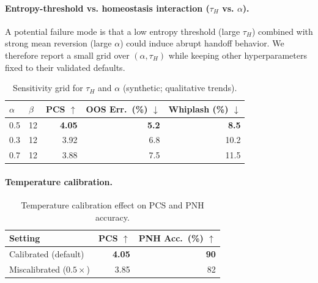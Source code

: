 \documentclass[11pt]{article}
\begin{document}
\paragraph{Entropy-threshold vs. homeostasis interaction ($\tau_H$ vs. $\alpha$).}
A potential failure mode is that a low entropy threshold (large $\tau_H$) combined with strong mean reversion (large $\alpha$) could induce abrupt handoff behavior. We therefore report a small grid over $(\alpha,\tau_H)$ while keeping other hyperparameters fixed to their validated defaults.

\begin{table}[h]
  \caption{Sensitivity grid for $\tau_H$ and $\alpha$ (synthetic; qualitative trends).}
  \label{tab:beta-alpha-grid}
  \centering
  \small
  \begin{tabular}{llrrr}
    \toprule
    $\alpha$ & $\beta$ & PCS $\uparrow$ & OOS Err.\ (\%) $\downarrow$ & Whiplash (\%) $\downarrow$ \\
    \midrule
    0.5 & 12 & \textbf{4.05} & \textbf{5.2} & \textbf{8.5} \\
    0.3 & 12 & 3.92 & 6.8 & 10.2 \\
    0.7 & 12 & 3.88 & 7.5 & 11.5 \\
    \bottomrule
  \end{tabular}
\end{table}

\paragraph{Temperature calibration.}
\begin{table}[h]
  \caption{Temperature calibration effect on PCS and PNH accuracy.}
  \label{tab:temperature-sweep}
  \centering
  \small
  \begin{tabular}{lrr}
    \toprule
    Setting & PCS $\uparrow$ & PNH Acc.\ (\%) $\uparrow$ \\
    \midrule
    Calibrated (default) & \textbf{4.05} & \textbf{90} \\
    Miscalibrated ($0.5\times$) & 3.85 & 82 \\
    \bottomrule
  \end{tabular}
\end{table}
\end{document}
